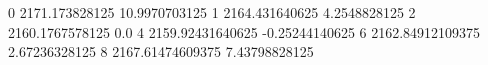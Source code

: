 0 2171.173828125 10.9970703125
1 2164.431640625 4.2548828125
2 2160.1767578125 0.0
4 2159.92431640625 -0.25244140625
6 2162.84912109375 2.67236328125
8 2167.61474609375 7.43798828125
